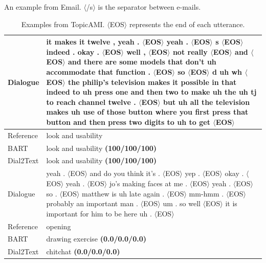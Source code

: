 \documentclass[letterpaper]{article} %
\begin{document}
\begin{table}
	\caption{An example from Email. $\langle$/s$\rangle$ is the separator between e-mails.}
	\label{tab:emailcase1}  
\end{table}

\begin{table}
	\centering
	\small
	\begin{tabular}{p{1.5cm}p{14.5cm}}
		\toprule[1pt]
		
		Dialogue &it makes it twelve , yeah . $\langle$EOS$\rangle$ yeah . $\langle$EOS$\rangle$ s $\langle$EOS$\rangle$ indeed . okay . $\langle$EOS$\rangle$ well , $\langle$EOS$\rangle$ not really $\langle$EOS$\rangle$ and $\langle$EOS$\rangle$ and there are some models that don't uh accommodate that function . $\langle$EOS$\rangle$ so $\langle$EOS$\rangle$ d uh wh $\langle$EOS$\rangle$ the philip's television makes it possible in that indeed to uh press one and then two to make uh the uh tj to reach channel twelve . $\langle$EOS$\rangle$ but uh all the television makes uh use of those button where you first press that button and then press two digits to uh to get $\langle$EOS$\rangle$\\
		\hline
		Reference &  look and usability\\
		\hline
		BART &  look and usability \textbf{(100/100/100)}\\
		\hline
		Dial2Text &  look and usability \textbf{(100/100/100)}\\
		\midrule[1pt]
		
		Dialogue &yeah . $\langle$EOS$\rangle$ and do you think it's . $\langle$EOS$\rangle$ yep . $\langle$EOS$\rangle$ okay . $\langle$EOS$\rangle$ yeah . $\langle$EOS$\rangle$ jo's making faces at me . $\langle$EOS$\rangle$  yeah . $\langle$EOS$\rangle$  so . $\langle$EOS$\rangle$  matthew is uh late again . $\langle$EOS$\rangle$  mm-hmm . $\langle$EOS$\rangle$  probably an important man . $\langle$EOS$\rangle$  um . so well $\langle$EOS$\rangle$  it is important for him to be here uh . $\langle$EOS$\rangle$ \\
		\hline
		Reference &opening \\
		\hline
		BART & drawing exercise \textbf{(0.0/0.0/0.0)}\\
		\hline
		Dial2Text & chitchat \textbf{(0.0/0.0/0.0)}\\
		\bottomrule[1pt]
	\end{tabular}
	
	\caption{Examples from TopicAMI. $\langle$EOS$\rangle$ represents the end of each utterance.}
	\label{tab:topicamicase1}  
\end{table}



\end{document}
